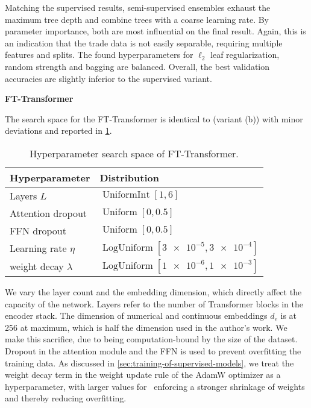 Matching the supervised results, semi-supervised ensembles exhaust the maximum tree depth and combine trees with a coarse learning rate. By parameter importance, both are most influential on the final result. Again, this is an indication that the trade data is not easily separable, requiring multiple features and splits. The found hyperparameters for $\ell_2$ leaf regularization, random strength and bagging are balanced. Overall, the best validation accuracies are slightly inferior to the supervised variant.

\clearpage

\textbf{FT-Transformer}

The search space for the FT-Transformer is identical to \textcite[][18]{gorishniyRevisitingDeepLearning2021} (variant (b)) with minor deviations and reported in \cref{tab:hyperparameter-space-2}.

\begin{table}[!h]
    \centering
    \caption[Hyperparameter Search Space of FT-Transformer]{Hyperparameter search space of FT-Transformer.}
    \label{tab:hyperparameter-space-2}
    \begin{tabular}{@{}ll@{}}
        \toprule
        Hyperparameter         & Distribution                                        \\ \midrule
        Layers $L$             & $\operatorname{UniformInt}[1,6]$                    \\
        Attention dropout      & $\operatorname{Uniform}[0, 0.5]$                    \\
        \gls{FFN} dropout      & $\operatorname{Uniform}[0, 0.5]$                    \\
        Learning rate $\eta$   & $\operatorname{LogUniform}[\num{3e-5}, \num{3e-4}]$ \\
        weight decay $\lambda$ & $\operatorname{LogUniform}[\num{1e-6}, \num{1e-3}]$ \\ \bottomrule
    \end{tabular}
\end{table}

We vary the layer count and the embedding dimension, which directly affect the capacity of the network. Layers refer to the number of Transformer blocks in the encoder stack. The dimension of numerical and continuous embeddings $d_e$ is at \num{256} at maximum, which is half the dimension used in the author's work. We make this sacrifice, due to being computation-bound by the size of the dataset. Dropout in the attention module and the \gls{FFN} is used to prevent overfitting the training data. As discussed in \cref{sec:training-of-supervised-models}, we treat the weight decay term in the weight update rule of the AdamW optimizer as a hyperparameter, with larger values for \lambda~enforcing a stronger shrinkage of weights and thereby reducing overfitting.

